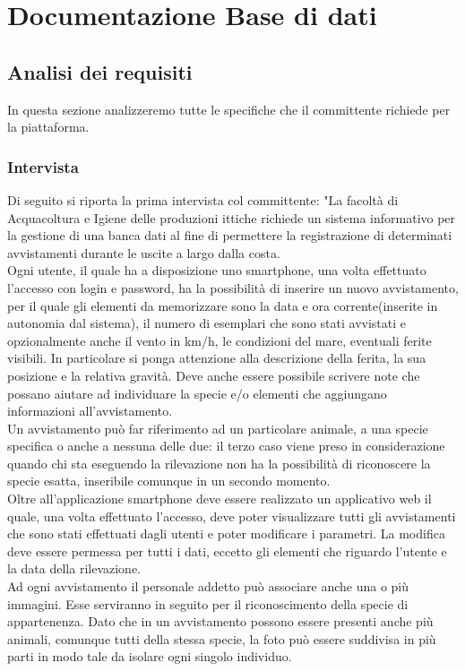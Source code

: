 \documentclass[a4paper,final,12pt]{report}
\begin{document}
\chapter{Documentazione Base di dati}
\section{Analisi dei requisiti}
In questa sezione analizzeremo tutte le specifiche che il committente richiede per la piattaforma.

\subsection{Intervista}
Di seguito si riporta la prima intervista col committente:
"La facoltà di Acquacoltura e Igiene delle produzioni ittiche richiede un sistema informativo per la gestione di una banca dati al fine di permettere la registrazione di determinati avvistamenti durante le uscite a largo dalla costa.\\
Ogni utente, il quale ha a disposizione uno smartphone, una volta effettuato l'accesso con login e password, ha la possibilità di inserire un nuovo avvistamento, per il quale gli elementi da memorizzare sono la data e ora corrente(inserite in autonomia dal sistema), il numero di esemplari che sono stati avvistati e opzionalmente anche il vento in km/h, le condizioni del mare, eventuali ferite visibili. In particolare si ponga attenzione alla descrizione della ferita, la sua posizione e la relativa gravità. Deve anche essere possibile scrivere note che possano aiutare ad individuare la specie e/o elementi che aggiungano informazioni all'avvistamento. 
\\
Un avvistamento può far riferimento ad un particolare animale, a una specie specifica o anche a nessuna delle due: il terzo caso viene preso in considerazione quando chi sta eseguendo la rilevazione non ha la possibilità di riconoscere la specie esatta, inseribile comunque in un secondo momento.
\\
Oltre all'applicazione smartphone deve essere realizzato un applicativo web il quale, una volta effettuato l'accesso, deve poter visualizzare tutti gli avvistamenti che sono stati effettuati dagli utenti e poter modificare i parametri. La modifica deve essere permessa per tutti i dati, eccetto gli elementi che riguardo l'utente e la data della rilevazione.
\\ 
Ad ogni avvistamento il personale addetto può associare anche una o più immagini. Esse serviranno in seguito per il riconoscimento della specie di appartenenza. Dato che in un avvistamento possono essere presenti anche più animali, comunque tutti della stessa specie, la foto può essere suddivisa in più parti in modo tale da isolare ogni singolo individuo.
\end{document}

